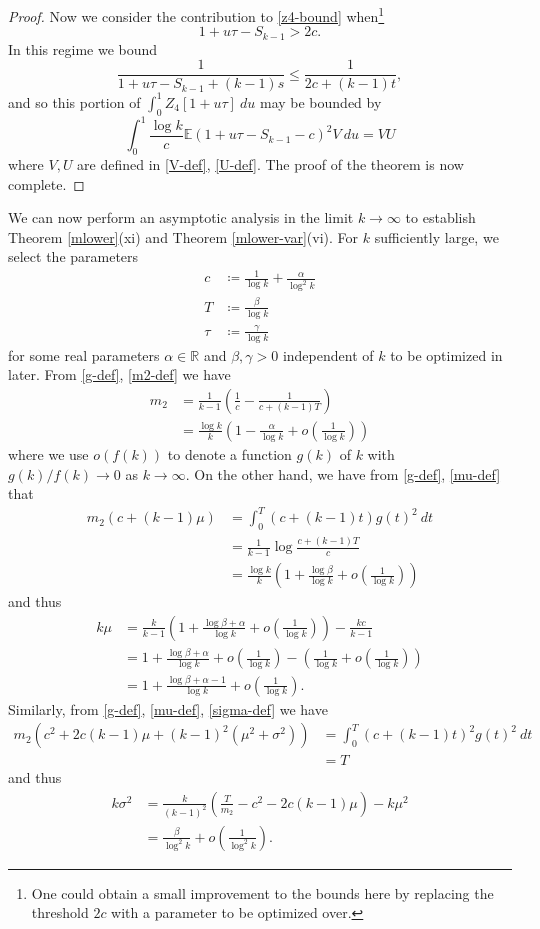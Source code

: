 \documentclass{bmcart}
\theoremstyle{plain}
\theoremstyle{definition}
\newcommand\E{\mathbb{E}}
\newcommand\R{\mathbb{R}}
\begin{document}
\begin{proof}
Now we consider the contribution to \eqref{z4-bound} when\footnote{One could obtain a small improvement to the bounds here by replacing the threshold $2c$ with a parameter to be optimized over.}
$$ 1+u\tau-S_{k-1} > 2c.$$
In this regime we bound
$$ \frac{1}{1+u\tau-S_{k-1}+(k-1)s} \leq \frac{1}{2c+(k-1)t},$$ 
and so this portion of $\int_0^1 Z_4[1+u\tau]\ du$ may be bounded by 
$$\int_0^1 \frac{\log k}{c} \E (1 + u\tau - S_{k-1} - c)^2 V\ du = VU$$
where $V, U$ are defined in \eqref{V-def}, \eqref{U-def}.  The proof of the theorem is now complete.
\end{proof}

We can now perform an asymptotic analysis in the limit $k \to \infty$ to establish Theorem \ref{mlower}(xi) and Theorem \ref{mlower-var}(vi).  For $k$ sufficiently large, we select the parameters
\begin{align*}
c &\coloneqq \frac{1}{\log k} + \frac{\alpha}{\log^2 k} \\
T &\coloneqq \frac{\beta}{\log k} \\
\tau &\coloneqq \frac{\gamma}{\log k}
\end{align*}
for some real parameters $\alpha \in \R$ and $\beta,\gamma > 0$ independent of $k$ to be optimized in later.  From \eqref{g-def}, \eqref{m2-def} we have
\begin{align*}
m_2 &= \frac{1}{k-1} \left( \frac{1}{c} - \frac{1}{c+(k-1)T} \right) \\
&= \frac{\log k}{k} \left(1 - \frac{\alpha}{\log k} + o( \frac{1}{\log k} ) \right)
\end{align*}
where we use $o(f(k))$ to denote a function $g(k)$ of $k$ with $g(k)/f(k) \to 0$ as $k \to \infty$.  On the other hand, we have from \eqref{g-def}, \eqref{mu-def} that
\begin{align*}
m_2 (c + (k-1) \mu) &= \int_0^T (c+(k-1)t) g(t)^2\ dt \\
&= \frac{1}{k-1} \log \frac{c+(k-1)T}{c} \\
&= \frac{\log k}{k} \left(1 + \frac{\log \beta}{\log k} + o( \frac{1}{\log k} ) \right)
\end{align*}
and thus
\begin{align*}
 k\mu &= \frac{k}{k-1} \left(1 + \frac{\log \beta + \alpha}{\log k} + o(\frac{1}{\log k} ) \right) - \frac{kc}{k-1} \\
&= 1 + \frac{\log \beta + \alpha}{\log k} + o\left( \frac{1}{\log k} \right) - \left( \frac{1}{\log k} + o\left( \frac{1}{\log k} \right) \right)\\
&= 1 + \frac{\log \beta + \alpha - 1}{\log k} + o\left( \frac{1}{\log k} \right).
\end{align*}
Similarly, from \eqref{g-def}, \eqref{mu-def}, \eqref{sigma-def} we have
\begin{align*}
m_2 (c^2 + 2c(k-1)\mu + (k-1)^2 (\mu^2+\sigma^2)) &= \int_0^T (c+(k-1)t)^2 g(t)^2\ dt \\
&= T
\end{align*}
and thus
\begin{align*}
k \sigma^2 &= \frac{k}{(k-1)^2} \left(\frac{T}{m_2} - c^2 - 2c(k-1)\mu\right) - k \mu^2 \\
&= \frac{\beta}{\log^2 k} + o( \frac{1}{\log^2 k} ).
\end{align*}
\end{document}
